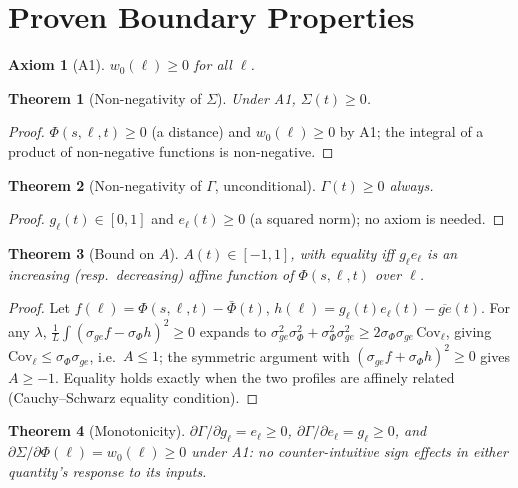 \documentclass[11pt]{article}
\newtheorem{theorem}{Theorem}
\newtheorem{axiom}{Axiom}
\begin{document}
\section{Proven Boundary Properties}

\begin{axiom}[A1]
$w_0(\ell)\ge 0$ for all $\ell$.
\end{axiom}

\begin{theorem}[Non-negativity of $\Sigma$]
Under A1, $\Sigma(t)\ge 0$.
\end{theorem}
\begin{proof}
$\Phi(s,\ell,t)\ge 0$ (a distance) and $w_0(\ell)\ge 0$ by A1; the integral of a product of non-negative functions is non-negative.
\end{proof}

\begin{theorem}[Non-negativity of $\Gamma$, unconditional]
$\Gamma(t)\ge 0$ always.
\end{theorem}
\begin{proof}
$g_\ell(t)\in[0,1]$ and $e_\ell(t)\ge 0$ (a squared norm); no axiom is needed.
\end{proof}

\begin{theorem}[Bound on $A$]
$A(t)\in[-1,1]$, with equality iff $g_\ell e_\ell$ is an increasing (resp.\ decreasing) affine function of $\Phi(s,\ell,t)$ over $\ell$.
\end{theorem}
\begin{proof}
Let $f(\ell)=\Phi(s,\ell,t)-\bar\Phi(t)$, $h(\ell)=g_\ell(t)e_\ell(t)-\overline{ge}(t)$. For any $\lambda$, $\frac1L\int(\sigma_{ge}f-\sigma_\Phi h)^2 \ge 0$ expands to $\sigma_{ge}^2\sigma_\Phi^2 + \sigma_\Phi^2\sigma_{ge}^2 \ge 2\sigma_\Phi\sigma_{ge}\,\mathrm{Cov}_\ell$, giving $\mathrm{Cov}_\ell\le\sigma_\Phi\sigma_{ge}$, i.e.\ $A\le1$; the symmetric argument with $(\sigma_{ge}f+\sigma_\Phi h)^2\ge0$ gives $A\ge-1$. Equality holds exactly when the two profiles are affinely related (Cauchy--Schwarz equality condition).
\end{proof}

\begin{theorem}[Monotonicity]
$\partial\Gamma/\partial g_\ell = e_\ell\ge0$, $\partial\Gamma/\partial e_\ell=g_\ell\ge0$, and $\partial\Sigma/\partial\Phi(\ell)=w_0(\ell)\ge0$ under A1: no counter-intuitive sign effects in either quantity's response to its inputs.
\end{theorem}
\end{document}
